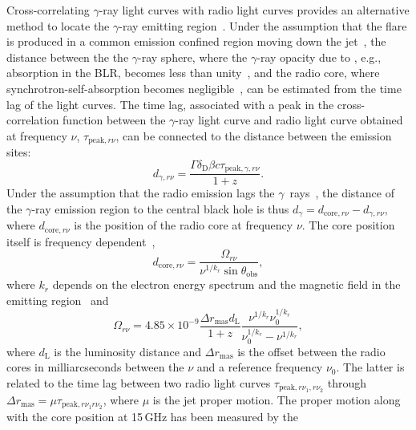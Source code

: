 \documentclass[twocolumn,linenumbers]{aastex62}
\newcommand{\Grays}{$\gamma$~rays\xspace}
\newcommand{\gray}{$\gamma$-ray\xspace}
\begin{document}
Cross-correlating \gray light curves with radio light curves provides an alternative method to locate the \gray emitting region~\citep[e.g.,][]{2014MNRAS.441.1899F}.
Under the assumption that the flare is produced in a common emission confined region moving down the jet~\citep[e.g.,][]{2014MNRAS.445..428M},
the distance between the 
the \gray sphere, where the \gray opacity due to , e.g., absorption in the BLR, becomes less than unity~\citep{1995ApJ...441...79B}, and the 
radio core, where synchrotron-self-absorption becomes negligible~\citep[][]{1981ApJ...243..700K}, 
can be estimated from the time lag of the light curves.
The time lag, associated with a peak in the cross-correlation function between the \gray light curve and radio light curve obtained at frequency $\nu$, $\tau_{\mathrm{peak},r\nu}$, can be connected to the distance between the emission sites:
\begin{equation}
    d_{\gamma,r\nu} = \frac{\Gamma\delta_\mathrm{D}\beta c\tau_{\mathrm{peak},\gamma,r\nu}}{1 + z}.
    \label{eq:dgamma-r}
\end{equation}
Under the assumption that the radio emission lags the \Grays~\citep{}, the distance of the \gray emission region to the central black hole is thus $d_\gamma = d_{\mathrm{core},r\nu} - d_{\gamma,r\nu}$, where $d_{\mathrm{core},r\nu}$ is the position of the radio core at frequency $\nu$.
The core position itself is frequency dependent~\citep[the core shift effect, see, e.g.,][]{1998A&A...330...79L},
\begin{equation}
    d_{\mathrm{core},r\nu} = \frac{\Omega_{r\nu}}{\nu^{1/k_r}\sin\theta_\mathrm{obs}},
     \label{eq:core-shift1}
\end{equation}
where $k_r$ depends on the electron energy spectrum and the magnetic field in the emitting region~\citep{1981ApJ...243..700K} and
\begin{equation}
    \Omega_{r\nu} = 4.85\times10^{-9} \frac{\Delta r_\mathrm{mas} d_\mathrm{L}}{1 + z}\frac{\nu^{1/k_r}\nu_0^{1/k_r}}{\nu_0^{1/k_r}-\nu^{1/k_r}},
    \label{eq:core-shift2}
\end{equation}
where $d_\mathrm{L}$ is the luminosity distance and $\Delta r_\mathrm{mas}$ is the offset between the radio cores in milliarcseconds between the $\nu$ and a reference frequency $\nu_0$. 
The latter is related to the time lag between two radio light curves $\tau_{\mathrm{peak},r\nu_1,r\nu_2}$ through 
$\Delta r_\mathrm{mas} = \mu \tau_{\mathrm{peak},r\nu_1r\nu_2}$, where $\mu$ is the jet proper motion. 
The proper motion along with the core position at 15\,GHz has been measured by the 
\end{document}
